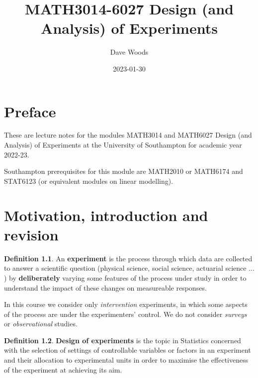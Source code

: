 \documentclass[
]{book}
\title{MATH3014-6027 Design (and Analysis) of Experiments}
\author{Dave Woods}
\date{2023-01-30}
\theoremstyle{definition}
\newtheorem{definition}{Definition}[chapter]
\theoremstyle{definition}
\theoremstyle{definition}
\theoremstyle{definition}
\theoremstyle{remark}
\begin{document}
\maketitle

{
\setcounter{tocdepth}{1}
\tableofcontents
}
\hypertarget{preface}{%
\chapter*{Preface}\label{preface}}

These are lecture notes for the modules MATH3014 and MATH6027 Design (and Analysis) of Experiments at the University of Southampton for academic year 2022-23.

Southampton prerequisites for this module are MATH2010 or MATH6174 and STAT6123 (or equivalent modules on linear modelling).

\newcommand{\bx}{\boldsymbol{x}}
\newcommand{\btheta}{\boldsymbol{\theta}}
\newcommand{\bbeta}{\boldsymbol{\beta}}
\newcommand{\bvarepsilon}{\boldsymbol{\varepsilon}}
\newcommand{\by}{\boldsymbol{y}}
\newcommand{\rT}{\mathrm{T}}
\newcommand{\Var}{\operatorname{Var}}
\newcommand{\bY}{\boldsymbol{y}}
\newcommand{\btau}{\boldsymbol{\tau}}

\hypertarget{intro}{%
\chapter{Motivation, introduction and revision}\label{intro}}

\begin{definition}
\protect\hypertarget{def:exp}{}\label{def:exp}An \textbf{experiment} is the process through which data are collected to answer a scientific question (physical science, social science, actuarial science \(\dots\)) by \textbf{deliberately} varying some features of the process under study in order to understand the impact of these changes on measureable responses.

In this course we consider only \emph{intervention} experiments, in which some aspects of the process are under the experimenters' control. We do not consider \emph{surveys} or \emph{observational} studies.
\end{definition}

\begin{definition}
\protect\hypertarget{def:design}{}\label{def:design}\textbf{Design of experiments} is the topic in Statistics concerned with the selection of settings of controllable variables or factors in an experiment and their allocation to experimental units in order to maximise the effectiveness of the experiment at achieving its aim.
\end{definition}
\end{document}
